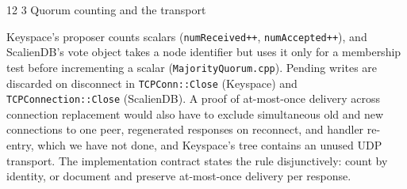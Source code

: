 \documentclass[final,5p,times,twocolumn,number]{elsarticle}
\makeatletter
\newcommand{\code}[1]{\texttt{#1}}
\renewcommand\subsection{\@startsection{subsection}{2}{\z@}%
           {12\p@ \@plus 6\p@ \@minus 3\p@}%
           {3\p@ \@plus 6\p@ \@minus 3\p@}%
           {\normalfont\normalsize\bfseries}}
\makeatother
\begin{document}
\subsection{Quorum counting and the transport}

Keyspace's proposer counts scalars (\code{numReceived++}, \code{numAccepted++}), and ScalienDB's vote object takes a node identifier but uses it only for a membership test before incrementing a scalar (\code{MajorityQuorum.cpp}).  Pending writes are discarded on disconnect in \code{TCPConn::Close} (Keyspace) and \code{TCPConnection::Close} (ScalienDB).  A proof of at-most-once delivery across connection replacement would also have to exclude simultaneous old and new connections to one peer, regenerated responses on reconnect, and handler re-entry, which we have not done, and Keyspace's tree contains an unused UDP transport.  The implementation contract states the rule disjunctively: count by identity, or document and preserve at-most-once delivery per response.
\end{document}
